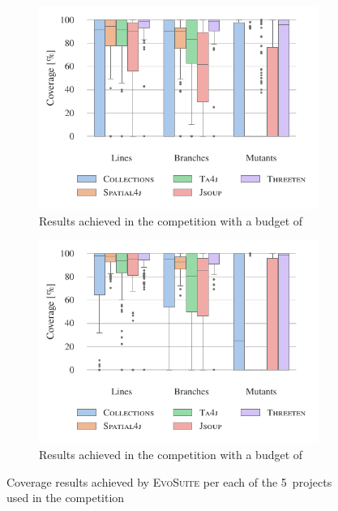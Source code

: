 \documentclass[10pt,conference]{IEEEtran}
\newcommand{\EVOSUITE}{\textsc{EvoSuite}\xspace}
\begin{document}
\begin{figure}
  \centering

  \begin{subfigure}{\columnwidth}
    \includegraphics[width=\linewidth]{data/CoverageByBenchmark30.pdf}
    \caption{Results achieved in the competition with a budget of \budgetShort}
    \label{fig:results30}
  \end{subfigure}

  \begin{subfigure}{\columnwidth}
    \includegraphics[width=\linewidth]{data/CoverageByBenchmark120.pdf}
    \caption{Results achieved in the competition with a budget of \budgetLong}
    \label{fig:results120}
  \end{subfigure}

  \caption{Coverage results achieved by \EVOSUITE per each of the 5~projects
    used in the competition}
  \label{fig:figures}
\end{figure}
\end{document}
